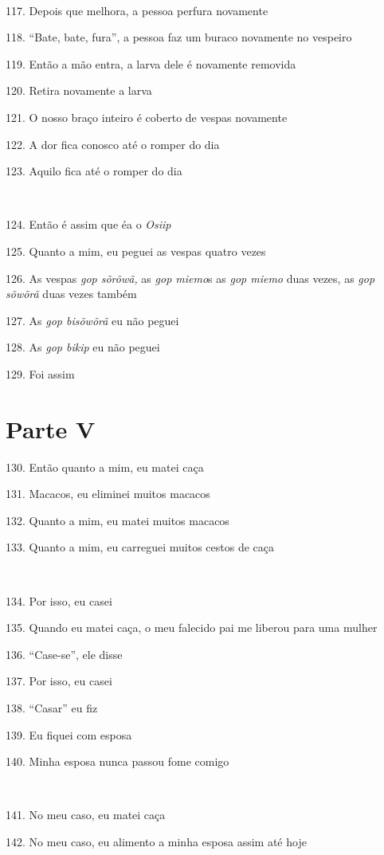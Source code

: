 ~

117. Depois que melhora, a pessoa perfura novamente

118. ``Bate, bate, fura'', a pessoa faz um buraco novamente no vespeiro

119. Então a mão entra, a larva dele é novamente removida

120. Retira novamente a larva

121. O nosso braço inteiro é coberto de vespas novamente

122. A dor fica conosco até o romper do dia

123. Aquilo fica até o romper do dia

~

124. Então é assim que éa o \emph{Osiip}

125. Quanto a mim, eu peguei as vespas quatro vezes

126. As vespas \emph{gop sõrõwã,} as \emph{gop miemo}s as \emph{gop miemo} duas vezes, as \emph{gop sõwõrã} duas vezes também

127. As \emph{gop bisõwõrã} eu não peguei

128. As \emph{gop bikip} eu não peguei

129. Foi assim

\section{Parte V}

130. Então quanto a mim, eu matei caça

131. Macacos, eu eliminei muitos macacos

132. Quanto a mim, eu matei muitos macacos

133. Quanto a mim, eu carreguei muitos cestos de caça

~

134. Por isso, eu casei

135. Quando eu matei caça, o meu falecido pai me liberou para uma mulher

136. ``Case-se'', ele disse

137. Por isso, eu casei

138. ``Casar'' eu fiz

139. Eu fiquei com esposa

140.  Minha esposa nunca passou fome comigo

~

141. No meu caso, eu matei caça

142. No meu caso, eu alimento a minha esposa assim até hoje

